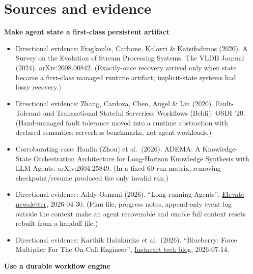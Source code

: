 \section*{Sources and evidence}

\textbf{Make agent state a first-class persistent artifact}

\begin{itemize}
\tightlist
\item
  Directional evidence: Fragkoulis, Carbone, Kalavri \& Katsifodimos (2020). A Survey on the Evolution of Stream Processing Systems. The VLDB Journal (2024). arXiv:2008.00842. (Exactly-once recovery arrived only when state became a first-class managed runtime artifact; implicit-state systems had lossy recovery.)
\item
  Directional evidence: Zhang, Cardoza, Chen, Angel \& Liu (2020). Fault-Tolerant and Transactional Stateful Serverless Workflows (Beldi). OSDI '20. (Hand-managed fault tolerance moved into a runtime abstraction with declared semantics; serverless benchmarks, not agent workloads.)
\item
  Corroborating case: Hanlin (Zhou) et al.~(2026). ADEMA: A Knowledge-State Orchestration Architecture for Long-Horizon Knowledge Synthesis with LLM Agents. arXiv:2604.25849. (In a fixed 60-run matrix, removing checkpoint/resume produced the only invalid run.)
\item
  Directional evidence: Addy Osmani (2026). ``Long-running Agents'', \href{https://addyo.substack.com/p/long-running-agents}{Elevate newsletter}, 2026-04-30. (Plan file, progress notes, append-only event log outside the context make an agent recoverable and enable full context resets rebuilt from a handoff file.)
\item
  Directional evidence: Karthik Halukurike et al.~(2026). ``Blueberry: Force Multiplier For The On-Call Engineer'', \href{https://tech.instacart.com/blueberry-force-multiplier-for-the-on-call-engineer-98c446dfcc12}{Instacart tech blog}, 2026-07-14.
\end{itemize}

\textbf{Use a durable workflow engine}

